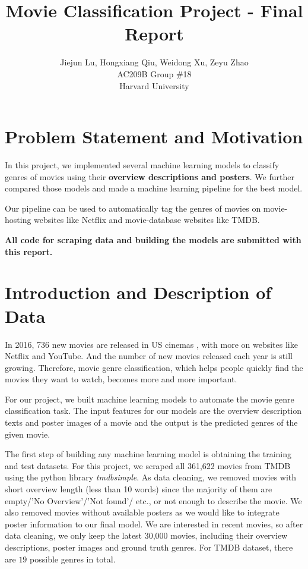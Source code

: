 \documentclass[12pt]{article} %
\title{Movie Classification Project - Final Report}
\author{
Jiejun Lu, Hongxiang Qiu, Weidong Xu, Zeyu Zhao\\
AC209B Group \#18\\
Harvard University\\
}
\begin{document}
\maketitle

\section{Problem Statement and Motivation}

In this project, we implemented several machine learning models to classify genres of movies using their {\bf overview descriptions and posters}. We further compared those models and made a machine learning pipeline for the best model.

Our pipeline can be used to automatically tag the genres of movies on movie-hosting websites like Netflix and movie-database websites like TMDB.

{\bf All code for scraping data and building the models are submitted with this report.}

\section{Introduction and Description of Data}

In 2016, 736 new movies are released in US cinemas \cite{web_movie_num}, with more on websites like Netflix and YouTube. And the number of new movies released each year is still growing. Therefore, movie genre classification, which helps people quickly find the movies they want to watch, becomes more and more important.

For our project, we built machine learning models to automate the movie genre classification task. The input features for our models are the overview description texts and poster images of a movie and the output is the predicted genres of the given movie.

The first step of building any machine learning model is obtaining the training and test datasets. For this project, we scraped all 361,622 movies from TMDB using the python library {\it tmdbsimple}. As data cleaning, we removed movies with short overview length (less than 10 words) since the majority of them are empty/'No Overview'/'Not found'/ etc., or not enough to describe the movie. We also removed movies without available posters as we would like to integrate poster information to our final model. We are interested in recent movies, so after data cleaning, we only keep the latest 30,000 movies, including their overview descriptions, poster images and ground truth genres. For TMDB dataset, there are $19$ possible genres in total.
\end{document}
